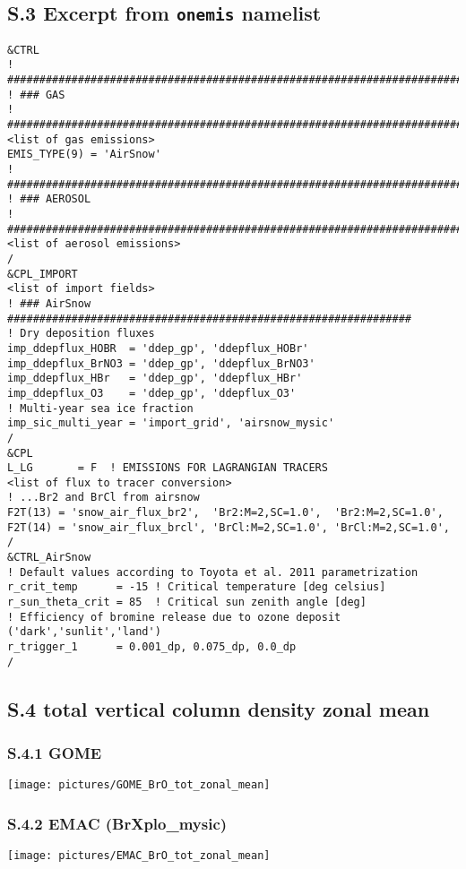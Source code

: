\documentclass[manuscript]{copernicus}
\begin{document}
\subsection*{S.3 Excerpt from \texttt{onemis} namelist}
\begin{verbatim}
&CTRL
! ###########################################################################
! ### GAS
! ###########################################################################
<list of gas emissions>
EMIS_TYPE(9) = 'AirSnow'
! ###########################################################################
! ### AEROSOL
! ###########################################################################
<list of aerosol emissions>
/
&CPL_IMPORT
<list of import fields>
! ### AirSnow ###############################################################
! Dry deposition fluxes
imp_ddepflux_HOBR  = 'ddep_gp', 'ddepflux_HOBr'
imp_ddepflux_BrNO3 = 'ddep_gp', 'ddepflux_BrNO3'                          
imp_ddepflux_HBr   = 'ddep_gp', 'ddepflux_HBr'
imp_ddepflux_O3    = 'ddep_gp', 'ddepflux_O3'
! Multi-year sea ice fraction
imp_sic_multi_year = 'import_grid', 'airsnow_mysic'
/
&CPL 
L_LG       = F  ! EMISSIONS FOR LAGRANGIAN TRACERS
<list of flux to tracer conversion>
! ...Br2 and BrCl from airsnow
F2T(13) = 'snow_air_flux_br2',  'Br2:M=2,SC=1.0',  'Br2:M=2,SC=1.0',
F2T(14) = 'snow_air_flux_brcl', 'BrCl:M=2,SC=1.0', 'BrCl:M=2,SC=1.0',
/
&CTRL_AirSnow
! Default values according to Toyota et al. 2011 parametrization
r_crit_temp      = -15 ! Critical temperature [deg celsius]
r_sun_theta_crit = 85  ! Critical sun zenith angle [deg]
! Efficiency of bromine release due to ozone deposit ('dark','sunlit','land')
r_trigger_1      = 0.001_dp, 0.075_dp, 0.0_dp
/
\end{verbatim}
%
\subsection*{S.4  total vertical column density zonal mean}
\subsubsection*{S.4.1 GOME}
\begin{center}
\texttt{[image: pictures/GOME\_BrO\_tot\_zonal\_mean]}
\subsubsection*{S.4.2 EMAC (BrXplo\_mysic)}
\texttt{[image: pictures/EMAC\_BrO\_tot\_zonal\_mean]}
\end{center}
%
\end{document}
